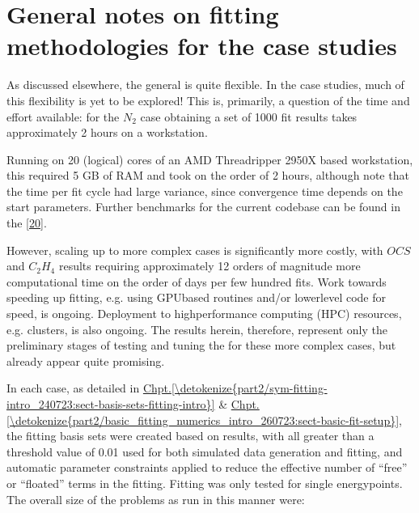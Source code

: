 \documentclass[letterpaper,table,10pt,english]{jupyterBook}
\begin{document}
\section{General notes on fitting methodologies for the case studies}
\label{\detokenize{part2/case-study-summaries_240723:general-notes-on-fitting-methodologies-for-the-case-studies}}
\sphinxAtStartPar
As discussed elsewhere, the general {\hyperref[\detokenize{backmatter/glossary:term-bootstrap-retrieval-protocol}]{}} is quite flexible. In the case studies, much of this flexibility is yet to be explored! This is, primarily, a question of the time and effort available: for the \(N_2\) case obtaining a set of 1000 fit results takes approximately 2 hours on a workstation.%
\begin{footnote}[1]\sphinxAtStartFootnote
Running on 20 (logical) cores of an AMD Threadripper 2950X based workstation, this required 5 GB of RAM and took on the order of 2 hours, although note that the time per fit cycle had large variance, since convergence time depends on the start parameters. Further benchmarks for the current codebase can be found in the  {[}\hyperlink{cite.backmatter/bibliography:id680}{20}{]}.
%
\end{footnote} However, scaling up to more complex cases is significantly more costly, with \(OCS\) and \(C_2H_4\) results requiring approximately 1\sphinxhyphen{}2 orders of magnitude more computational time \sphinxhyphen{} on the order of days per few hundred fits. Work towards speeding up fitting, e.g. using GPU\sphinxhyphen{}based routines and/or lower\sphinxhyphen{}level code for speed, is ongoing. Deployment to high\sphinxhyphen{}performance computing (HPC) resources, e.g. clusters, is also ongoing. The results herein, therefore, represent only the preliminary stages of testing and tuning the {\hyperref[\detokenize{backmatter/glossary:term-bootstrap-retrieval-protocol}]{}} for these more complex cases, but already appear quite promising.

\sphinxAtStartPar
In each case, as detailed in \hyperref[\detokenize{part2/sym-fitting-intro_240723:sect-basis-sets-fitting-intro}]{Chpt.\@ \ref{\detokenize{part2/sym-fitting-intro_240723:sect-basis-sets-fitting-intro}}} \& \hyperref[\detokenize{part2/basic_fitting_numerics_intro_260723:sect-basic-fit-setup}]{Chpt.\@ \ref{\detokenize{part2/basic_fitting_numerics_intro_260723:sect-basic-fit-setup}}}, the fitting basis sets were created based on  results, with all {\hyperref[\detokenize{backmatter/glossary:term-radial-matrix-elements}]{}} greater than a threshold value of 0.01 used for both simulated data generation and fitting, and automatic parameter constraints applied to reduce the effective number of “free” or “floated” terms in the fitting. Fitting was only tested for single energy\sphinxhyphen{}points. The overall size of the problems as run in this manner were:
\end{document}
